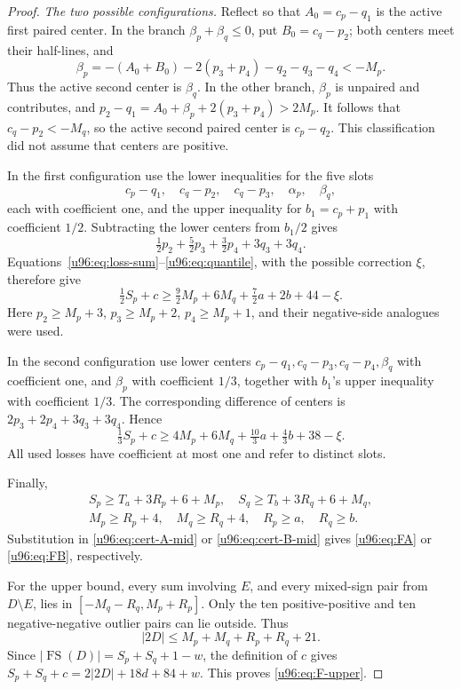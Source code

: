 \documentclass[11pt,a4paper]{article}
\theoremstyle{remark}
\newcommand{\FS}{\operatorname{FS}}
\begin{document}
\begin{proof}
\emph{The two possible configurations.}
Reflect so that $A_0=c_p-q_1$ is the active first paired center.
In the branch $\beta_p+\beta_q\leq0$, put $B_0=c_q-p_2$; both centers
meet their half-lines, and
\[
 \beta_p=-(A_0+B_0)-2(p_3+p_4)-q_2-q_3-q_4<-M_p.
\]
Thus the active second center is $\beta_q$. In the other branch,
$\beta_p$ is unpaired and contributes, and
$p_2-q_1=A_0+\beta_p+2(p_3+p_4)>2M_p$.
It follows that $c_q-p_2<-M_q$, so the active second paired center is
$c_p-q_2$. This classification did not assume that centers are positive.

In the first configuration use the lower inequalities for the five slots
\[
 c_p-q_1,\quad c_q-p_2,\quad c_q-p_3,\quad\alpha_p,\quad\beta_q,
\]
each with coefficient one, and the upper inequality for $b_1=c_p+p_1$
with coefficient $1/2$. Subtracting the lower centers from $b_1/2$ gives
\[
 \tfrac12p_2+\tfrac52p_3+\tfrac32p_4+3q_3+3q_4.
\]
Equations~\eqref{u96:eq:loss-sum}--\eqref{u96:eq:quantile}, with the possible
correction $\xi$, therefore give
\begin{equation}
 \tfrac12 S_p+c
 \geq\tfrac92M_p+6M_q+\tfrac72a+2b+44-\xi.
 \label{u96:eq:cert-A-mid}
\end{equation}
Here $p_2\geq M_p+3$, $p_3\geq M_p+2$, $p_4\geq M_p+1$, and their
negative-side analogues were used.

In the second configuration use lower centers
$c_p-q_1,c_q-p_3,c_q-p_4,\beta_q$ with coefficient one, and $\beta_p$
with coefficient $1/3$, together with $b_1$'s upper inequality with
coefficient $1/3$. The corresponding difference of centers is
$2p_3+2p_4+3q_3+3q_4$. Hence
\begin{equation}
 \tfrac13 S_p+c
 \geq4M_p+6M_q+\tfrac{10}3a+\tfrac43b+38-\xi.
 \label{u96:eq:cert-B-mid}
\end{equation}
All used losses have coefficient at most one and refer to distinct slots.

Finally,
\begin{gather*}
 S_p\geq T_a+3R_p+6+M_p,\quad
 S_q\geq T_b+3R_q+6+M_q,\\
 M_p\geq R_p+4,\quad M_q\geq R_q+4,\quad R_p\geq a,\quad R_q\geq b.
\end{gather*}
Substitution in \eqref{u96:eq:cert-A-mid} or \eqref{u96:eq:cert-B-mid} gives
\eqref{u96:eq:FA} or \eqref{u96:eq:FB}, respectively.

For the upper bound, every sum involving $E$, and every mixed-sign pair
from $D\setminus E$, lies in
$[-M_q-R_q,M_p+R_p]$. Only the ten positive-positive and ten
negative-negative outlier pairs can lie outside. Thus
\[
 |2D|\leq M_p+M_q+R_p+R_q+21.
\]
Since $|\FS(D)|=S_p+S_q+1-w$, the definition of $c$ gives
$S_p+S_q+c=2|2D|+18d+84+w$. This proves \eqref{u96:eq:F-upper}.
\end{proof}
\end{document}
